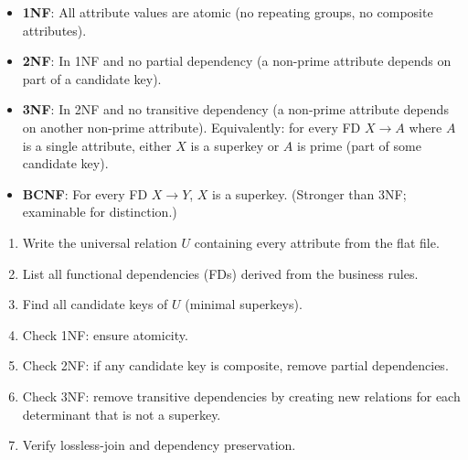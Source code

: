\documentclass[11pt]{article}
\newcommand{\cle}[1]{{\popxbold\color{popdark}#1}}
\begin{document}
\begin{definition}
\begin{itemize}
    \item \textbf{1NF}: All attribute values are atomic (no repeating groups, no composite attributes).
    \item \textbf{2NF}: In 1NF and no \cle{partial dependency} (a non-prime attribute depends on part of a candidate key).
    \item \textbf{3NF}: In 2NF and no \cle{transitive dependency} (a non-prime attribute depends on another non-prime attribute). Equivalently: for every FD $X \rightarrow A$ where $A$ is a single attribute, either $X$ is a superkey or $A$ is prime (part of some candidate key).
    \item \textbf{BCNF}: For every FD $X \rightarrow Y$, $X$ is a superkey. (Stronger than 3NF; examinable for distinction.)
\end{itemize}
\end{definition}

\begin{methode}
\begin{enumerate}
    \item Write the \cle{universal relation} $U$ containing every attribute from the flat file.
    \item List all \cle{functional dependencies} (FDs) derived from the business rules.
    \item Find all \cle{candidate keys} of $U$ (minimal superkeys).
    \item Check 1NF: ensure atomicity.
    \item Check 2NF: if any candidate key is composite, remove partial dependencies.
    \item Check 3NF: remove transitive dependencies by creating new relations for each determinant that is not a superkey.
    \item Verify lossless-join and dependency preservation.
\end{enumerate}
\end{methode}
\end{document}
